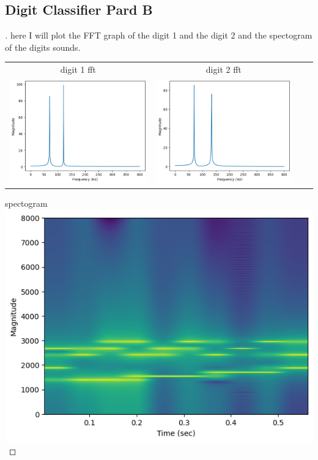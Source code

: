 \documentclass{article}
\begin{document}
\subsection{Digit Classifier Pard B}
\begin{proof}[]
    here I will plot the FFT graph of the digit 1 and the digit 2 and the spectogram of the digits sounds.
    \centering
    \begin{tabular}{cccc}
        digit 1 fft & digit 2 fft\\
        \includegraphics[width=.5\linewidth]{phone_1_fft.png} & \includegraphics[width=.5\linewidth]{phone_2_fft.png}
    \end{tabular}
    spectogram\\
    \centering
        \includegraphics[width=.7\linewidth]{spect.png}
\end{proof}
\end{document}
